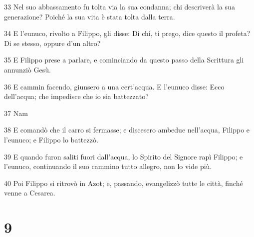 \par 33 Nel suo abbassamento fu tolta via la sua condanna; chi descriverà la sua generazione? Poiché la sua vita è stata tolta dalla terra.
\par 34 E l'eunuco, rivolto a Filippo, gli disse: Di chi, ti prego, dice questo il profeta? Di se stesso, oppure d'un altro?
\par 35 E Filippo prese a parlare, e cominciando da questo passo della Scrittura gli annunziò Gesù.
\par 36 E cammin facendo, giunsero a una cert'acqua. E l'eunuco disse: Ecco dell'acqua; che impedisce che io sia battezzato?
\par 37 Nam
\par 38 E comandò che il carro si fermasse; e discesero ambedue nell'acqua, Filippo e l'eunuco; e Filippo lo battezzò.
\par 39 E quando furon saliti fuori dall'acqua, lo Spirito del Signore rapì Filippo; e l'eunuco, continuando il suo cammino tutto allegro, non lo vide più.
\par 40 Poi Filippo si ritrovò in Azot; e, passando, evangelizzò tutte le città, finché venne a Cesarea.

\chapter{9}

